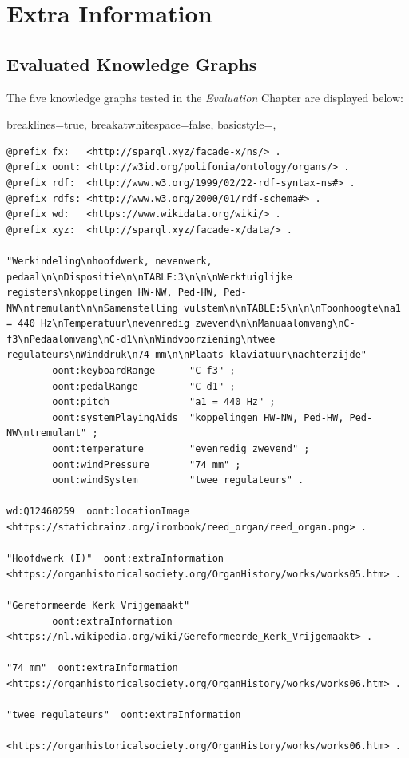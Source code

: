 \UseRawInputEncoding
\chapter{Extra Information}
\section{Evaluated Knowledge Graphs}
The five knowledge graphs tested in the \textit{Evaluation} Chapter are displayed below:

\lstset
{
    breaklines=true,
    breakatwhitespace=false,
    basicstyle=\linespread{1}\ttfamily,
}
\begin{lstlisting}[caption={Part14\_000Brouwershaven}]
@prefix fx:   <http://sparql.xyz/facade-x/ns/> .
@prefix oont: <http://w3id.org/polifonia/ontology/organs/> .
@prefix rdf:  <http://www.w3.org/1999/02/22-rdf-syntax-ns#> .
@prefix rdfs: <http://www.w3.org/2000/01/rdf-schema#> .
@prefix wd:   <https://www.wikidata.org/wiki/> .
@prefix xyz:  <http://sparql.xyz/facade-x/data/> .

"Werkindeling\nhoofdwerk, nevenwerk, pedaal\n\nDispositie\n\nTABLE:3\n\n\nWerktuiglijke registers\nkoppelingen HW-NW, Ped-HW, Ped-NW\ntremulant\n\nSamenstelling vulstem\n\nTABLE:5\n\n\nToonhoogte\na1 = 440 Hz\nTemperatuur\nevenredig zwevend\n\nManuaalomvang\nC-f3\nPedaalomvang\nC-d1\n\nWindvoorziening\ntwee regulateurs\nWinddruk\n74 mm\n\nPlaats klaviatuur\nachterzijde"
        oont:keyboardRange      "C-f3" ;
        oont:pedalRange         "C-d1" ;
        oont:pitch              "a1 = 440 Hz" ;
        oont:systemPlayingAids  "koppelingen HW-NW, Ped-HW, Ped-NW\ntremulant" ;
        oont:temperature        "evenredig zwevend" ;
        oont:windPressure       "74 mm" ;
        oont:windSystem         "twee regulateurs" .

wd:Q12460259  oont:locationImage  <https://staticbrainz.org/irombook/reed_organ/reed_organ.png> .

"Hoofdwerk (I)"  oont:extraInformation  <https://organhistoricalsociety.org/OrganHistory/works/works05.htm> .

"Gereformeerde Kerk Vrijgemaakt"
        oont:extraInformation  <https://nl.wikipedia.org/wiki/Gereformeerde_Kerk_Vrijgemaakt> .

"74 mm"  oont:extraInformation  <https://organhistoricalsociety.org/OrganHistory/works/works06.htm> .

"twee regulateurs"  oont:extraInformation
                <https://organhistoricalsociety.org/OrganHistory/works/works06.htm> .


\end{lstlisting}
